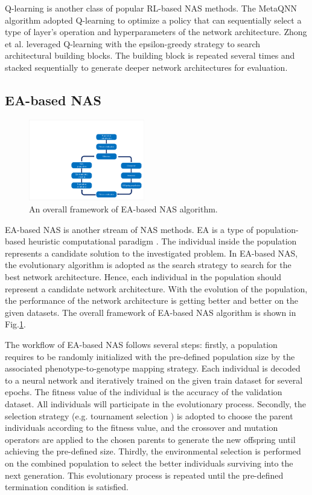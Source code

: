 \documentclass[journal]{IEEEtran}
\begin{document}
Q-learning \cite{watkins1989learning} is another class of popular RL-based NAS methods. The MetaQNN algorithm \cite{baker2016designing} adopted Q-learning to optimize a policy that can sequentially select a type of layer’s operation and hyperparameters of the network architecture. Zhong et al. \cite{zhong2018practical, zhong2020blockqnn} leveraged Q-learning with the epsilon-greedy strategy to search architectural building blocks. The building block is repeated several times and stacked sequentially to generate deeper network architectures for evaluation.

\subsection{EA-based NAS}

\begin{figure}[H]
\centering %
\includegraphics[width=0.45\textwidth]{3.pdf} %
\caption{An overall framework of EA-based NAS algorithm.} %
\label{Fig_3}
\end{figure}

EA-based NAS is another stream of NAS methods. EA is a type of population-based heuristic computational paradigm \cite{schmitt2001theory}. The individual inside the population represents a candidate solution to the investigated problem. In EA-based NAS, the evolutionary algorithm is adopted as the search strategy to search for the best network architecture. Hence, each individual in the population should represent a candidate network architecture. With the evolution of the population, the performance of the network architecture is getting better and better on the given datasets. The overall framework of EA-based NAS algorithm is shown in Fig.\ref{Fig_3}.

The workflow of EA-based NAS follows several steps: firstly, a population requires to be randomly initialized with the pre-defined population size by the associated phenotype-to-genotype mapping strategy. Each individual is decoded to a neural network and iteratively trained on the given train dataset for several epochs. The fitness value of the individual is the accuracy of the validation dataset. All individuals will participate in the evolutionary process. Secondly, the selection strategy (e.g. tournament selection \cite{miller1995genetic}) is adopted to choose the parent individuals according to the fitness value, and the crossover and mutation operators are applied to the chosen parents to generate the new offspring until achieving the pre-defined size. Thirdly, the environmental selection is performed on the combined population to select the better individuals surviving into the next generation. This evolutionary process is repeated until the pre-defined termination condition is satisfied.
\end{document}
